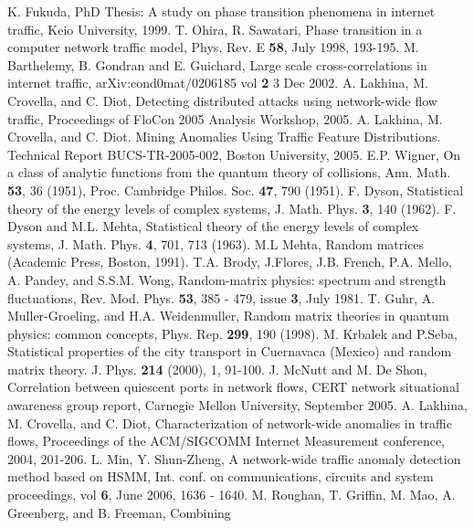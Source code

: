 \documentclass{IEEEtran}
\newcommand{\noun}[1]{\textsc{#1}}
\begin{document}
\begin{thebibliography}{10}
K. Fukuda, PhD Thesis: A study on phase transition phenomena in internet
traffic, Keio University, 1999.
T. Ohira, R. Sawatari, Phase transition in a computer network traffic
model, Phys. Rev. E \textbf{58}, July 1998, 193-195.
M. Barthelemy, B. Gondran and E. Guichard, Large scale cross-correlations
in internet traffic, arXiv:cond0mat/0206185 vol \textbf{2} 3 Dec 2002.
A. Lakhina, M. Crovella, and C. Diot, Detecting distributed attacks
using network-wide flow traffic, Proceedings of FloCon 2005 Analysis
Workshop, 2005.
A. Lakhina, M. Crovella, and C. Diot. Mining Anomalies Using Traffic
Feature Distributions. Technical Report BUCS-TR-2005-002, Boston University,
2005.
E.P. Wigner, On a class of analytic functions from the quantum theory
of collisions, Ann. Math. \textbf{\noun{53}}, 36 (1951), Proc. Cambridge
Philos. Soc. \textbf{47}, 790 (1951).
F. Dyson, Statistical theory of the energy levels of complex systems,
J. Math. Phys. \textbf{3}, 140 (1962).
F. Dyson and M.L. Mehta, Statistical theory of the energy levels of
complex systems, J. Math. Phys. \textbf{4}, 701, 713 (1963).
M.L Mehta, Random matrices (Academic Press, Boston, 1991).
T.A. Brody, J.Flores, J.B. French, P.A. Mello, A. Pandey, and S.S.M.
Wong, Random-matrix physics: spectrum and strength fluctuations, Rev.
Mod. Phys. \textbf{53}, 385 - 479, issue \textbf{3}, July 1981.
T. Guhr, A. Muller-Groeling, and H.A. Weidenmuller, Random matrix
theories in quantum physics: common concepts, Phys. Rep. \textbf{299},
190 (1998).
M. Krbalek and P.Seba, Statistical properties of the city transport
in Cuernavaca (Mexico) and random matrix theory. J. Phys. \textbf{214}
(2000), 1, 91-100.
J. McNutt and M. De Shon, Correlation between quiescent ports in network
flows, CERT network situational awareness group report, Carnegie Mellon
University, September 2005.
A. Lakhina, M. Crovella, and C. Diot, Characterization of network-wide
anomalies in traffic flows, Proceedings of the ACM/SIGCOMM Internet
Measurement conference, 2004, 201-206.
L. Min, Y. Shun-Zheng, A network-wide traffic anomaly detection method
based on HSMM, Int. conf. on communications, circuits and system proceedings,
vol \textbf{6}, June 2006, 1636 - 1640.
M. Roughan, T. Griffin, M. Mao, A. Greenberg, and B. Freeman, Combining

\end{thebibliography}
\end{document}
